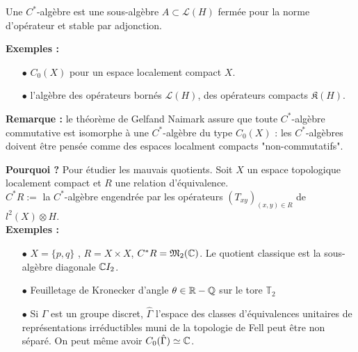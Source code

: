 \documentclass{beamer}
\begin{document}
\begin{frame}
\begin{definition} Une $C^*$-algèbre est une sous-algèbre $A\subset \mathcal L(H)$
 fermée pour la norme d'opérateur et stable par adjonction.
\end{definition}
\textbf{Exemples :} 
\begin{itemize} 
\item[$\bullet$]$C_0(X)$ pour un espace localement compact $X$.
\item[$\bullet$] l'algèbre des opérateurs bornés $\mathcal L(H)$, des opérateurs compacts $\mathfrak K(H)$.
\end{itemize}

\textbf{Remarque :} le théorème de Gelfand Naimark assure que toute $C^*$-algèbre commutative est isomorphe à une $C^*$-algèbre du type $C_0(X)$ : les $C^*$-algèbres doivent être pensée comme des espaces localment compacts "non-commutatifs".
\end{frame}

\begin{frame}
\textbf{Pourquoi ?} 
Pour étudier les mauvais quotients. Soit $X$ un espace topologique localement compact et $R$ une relation d'équivalence.\\
$C^* R :=$ la $C^*$-algèbre engendrée par les opérateurs $(T_{xy})_{(x,y)\in R}$ de $l^2(X)\otimes H$.\\
\textbf{Exemples :}
\begin{itemize}
\item[$\bullet$] $X=\{p,q\}$ , $R=X\times X$, $C^* R = \mathfrak M_2(\mathbb C)$. Le quotient classique est la sous-algèbre diagonale $\mathbb C I_2$.
\item[$\bullet$] Feuilletage de Kronecker d'angle $\theta\in \mathbb R-\mathbb Q$ sur le tore $\mathbb T_2$
\item[$\bullet$] Si $\Gamma$ est un groupe discret, $\hat\Gamma$ l'espace des classes d'équivalences unitaires de représentations irréductibles muni de la topologie de Fell peut être non séparé. On peut même avoir $C_0(\hat \Gamma)\simeq \mathbb C$.
\end{itemize}
\end{frame}
\end{document}
